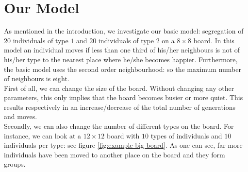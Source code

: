 \section{Our Model}
As mentioned in the introduction, we investigate our basic model: segregation of $20$ individuals of type $1$ and $20$ individuals of type $2$ on a $8 \times 8$ board.
In this model an individual moves if less than one third of his/her neighbours is not of his/her type to the nearest place where he/she becomes happier.
Furthermore, the basic model uses the second order neighbourhood: so the maximum number of neighbours is eight.\\

First of all, we can change the size of the board.
Without changing any other parameters, this only implies that the board becomes busier or more quiet.
This results respectively in an increase/decrease of the total number of generations and moves.\\

Secondly, we can also change the number of different types on the board.
For instance, we can look at a $12\times 12$ board with $10$ types of individuals and $10$ individuals per type: see figure \ref{fig:example big board}.
As one can see, far more individuals have been moved to another place on the board and they form groups.

